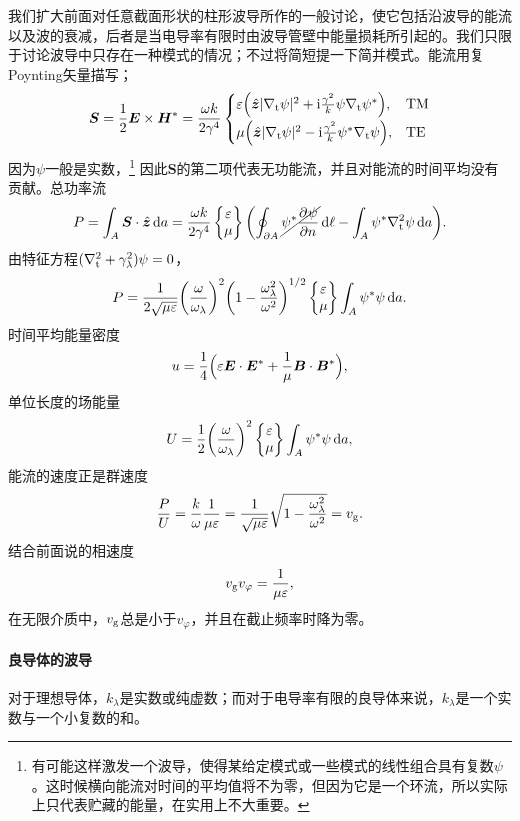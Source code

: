 我们扩大前面对任意截面形状的柱形波导所作的一般讨论，使它包括沿波导的能流以及波的衰减，后者是当电导率有限时由波导管壁中能量损耗所引起的。我们只限于讨论波导中只存在一种模式的情况；不过将简短提一下简并模式。能流用复Poynting矢量描写；
\begin{equation}
    \bm S=\frac12\bm E\times\bm H^\ast=\frac{\omega k}{2\gamma^4}
    \begin{cases}
        \varepsilon\Bigl(\mathop{}\!\hat{\bm{z}}|\nabla_\text t\psi|^2+\mathrm{i}\frac{\gamma^2}k\psi\nabla_\text t\psi^\ast\Bigr),&\text{TM}\\[1ex]
        \mu\Bigl(\mathop{}\!\hat{\bm{z}}|\nabla_\text t\psi|^2-\mathrm{i}\frac{\gamma^2}k\psi^\ast\nabla_\text t\psi\Bigr),&\text{TE}
    \end{cases}
\end{equation}
因为$\psi$一般是实数，\footnote{有可能这样激发一个波导，使得某给定模式或一些模式的线性组合具有复数$\psi$。这时候横向能流对时间的平均值将不为零，但因为它是一个环流，所以实际上只代表贮藏的能量，在实用上不大重要。}
因此$\bm S$的第二项代表无功能流，并且对能流的时间平均没有贡献。总功率流
\[
    P=\int_A\bm S\cdot\mathop{}\!\hat{\bm{z}}\mathop{}\!\mathrm{d} a=\frac{\omega k}{2\gamma^4}
    \begin{Bmatrix}
        \varepsilon\\\mu
    \end{Bmatrix}
    \biggl(\oint_{\partial A}\cancel{\psi^\ast\frac{\partial^{{}}\psi}{\partial{n}^{{}}}}\mathop{}\!\mathrm{d}\ell-\int_A\psi^\ast\nabla_\text t^2\psi\mathop{}\!\mathrm{d} a\biggr).
\]
由特征方程$(\nabla_\text t^2+\gamma_\lambda^2)\psi=0$，
\[
    P=\frac1{2\sqrt{\mu\varepsilon}}\biggl(\frac\omega{\omega_\lambda}\biggr)^2\biggl(1-\frac{\omega_\lambda^2}{\omega^2}\biggr)^{1/2}
    \begin{Bmatrix}
        \varepsilon\\\mu
    \end{Bmatrix}
    \int_A\psi^\ast\psi\mathop{}\!\mathrm{d} a.
\]
时间平均能量密度
\[
    u=\frac14\Bigl(\varepsilon\bm E\cdot\bm E^\ast+\frac1\mu\bm B\cdot\bm B^\ast\Bigr),
\]
单位长度的场能量
\[
    U=\frac12\biggl(\frac\omega{\omega_\lambda}\biggr)^2
    \begin{Bmatrix}
        \varepsilon\\\mu
    \end{Bmatrix}
    \int_A\psi^\ast\psi\mathop{}\!\mathrm{d} a,
\]
能流的速度正是群速度
\[
    \frac PU=\frac k\omega\frac1{\mu\varepsilon}=\frac1{\sqrt{\mu\varepsilon}}\sqrt{1-\frac{\omega_\lambda^2}{\omega^2}}=v_\text g.
\]
结合前面说的相速度
\begin{equation}
    v_\text gv_\varphi=\frac1{\mu\varepsilon},
\end{equation}
在无限介质中，$v_\text g$总是小于$v_\varphi$，并且在截止频率时降为零。
\paragraph{良导体的波导}
对于理想导体，$k_\lambda$是实数或纯虚数；而对于电导率有限的良导体来说，$k_\lambda$是一个实数与一个小复数的和。

